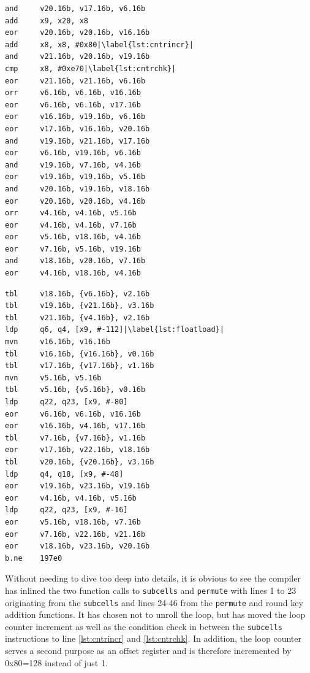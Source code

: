 \begin{minipage}{.45\textwidth}
    \begin{lstlisting}[language={[ARM]Assembler}, caption={Round function asm}, escapechar=|]
and     v20.16b, v17.16b, v6.16b
add     x9, x20, x8
eor     v20.16b, v20.16b, v16.16b
add     x8, x8, #0x80|\label{lst:cntrincr}|
and     v21.16b, v20.16b, v19.16b
cmp     x8, #0xe70|\label{lst:cntrchk}|
eor     v21.16b, v21.16b, v6.16b
orr     v6.16b, v6.16b, v16.16b
eor     v6.16b, v6.16b, v17.16b
eor     v16.16b, v19.16b, v6.16b
eor     v17.16b, v16.16b, v20.16b
and     v19.16b, v21.16b, v17.16b
eor     v6.16b, v19.16b, v6.16b
and     v19.16b, v7.16b, v4.16b
eor     v19.16b, v19.16b, v5.16b
and     v20.16b, v19.16b, v18.16b
eor     v20.16b, v20.16b, v4.16b
orr     v4.16b, v4.16b, v5.16b
eor     v4.16b, v4.16b, v7.16b
eor     v5.16b, v18.16b, v4.16b
eor     v7.16b, v5.16b, v19.16b
and     v18.16b, v20.16b, v7.16b
eor     v4.16b, v18.16b, v4.16b
    \end{lstlisting}
\end{minipage}\hfill
\begin{minipage}{.45\textwidth}
    \vspace*{7mm}
    \begin{lstlisting}[language={[ARM]Assembler}, firstnumber=24, escapechar=|]
tbl     v18.16b, {v6.16b}, v2.16b
tbl     v19.16b, {v21.16b}, v3.16b
tbl     v21.16b, {v4.16b}, v2.16b
ldp     q6, q4, [x9, #-112]|\label{lst:floatload}|
mvn     v16.16b, v16.16b
tbl     v16.16b, {v16.16b}, v0.16b
tbl     v17.16b, {v17.16b}, v1.16b
mvn     v5.16b, v5.16b
tbl     v5.16b, {v5.16b}, v0.16b
ldp     q22, q23, [x9, #-80]
eor     v6.16b, v6.16b, v16.16b
eor     v16.16b, v4.16b, v17.16b
tbl     v7.16b, {v7.16b}, v1.16b
eor     v17.16b, v22.16b, v18.16b
tbl     v20.16b, {v20.16b}, v3.16b
ldp     q4, q18, [x9, #-48]
eor     v19.16b, v23.16b, v19.16b
eor     v4.16b, v4.16b, v5.16b
ldp     q22, q23, [x9, #-16]
eor     v5.16b, v18.16b, v7.16b
eor     v7.16b, v22.16b, v21.16b
eor     v18.16b, v23.16b, v20.16b
b.ne    197e0
    \end{lstlisting}
\end{minipage}

Without needing to dive too deep into details, it is obvious to see the
compiler has inlined the two function calls to \texttt{subcells} and
\texttt{permute} with lines 1 to 23 originating from the \texttt{subcells} and
lines 24-46 from the \texttt{permute} and round key addition functions. It has
chosen not to unroll the loop, but has moved the loop counter increment as well
as the condition check in between the \texttt{subcells} instructions to line
\ref{lst:cntrincr} and \ref{lst:cntrchk}. In addition, the loop counter serves
a second purpose as an offset register and is therefore incremented by 0x80=128
instead of just 1.

